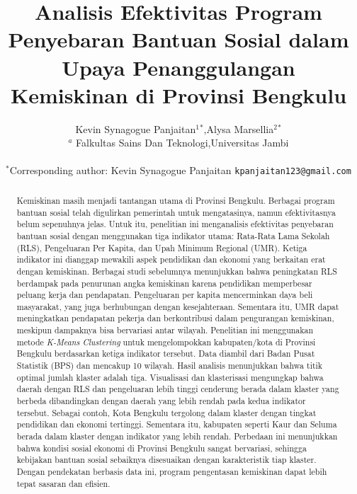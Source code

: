 \documentclass{article}
\title{Analisis Efektivitas Program Penyebaran Bantuan Sosial dalam Upaya Penanggulangan Kemiskinan di Provinsi Bengkulu}
\author{Kevin Synagogue Panjaitan$^{1}$$^{*}$,Alysa Marsellia$^{2}$$^{*}$  \\
        \small $^{a}$ Falkultas Sains Dan Teknologi,Universitas Jambi
        \\\\
        \small $^{*}$Corresponding author: Kevin Synagogue Panjaitan \tt{kpanjaitan123@gmail.com} \\
}
\date{}
\begin{document}
\maketitle


\begin{abstract} 
\noindent 

Kemiskinan masih menjadi tantangan utama di Provinsi Bengkulu. Berbagai program bantuan sosial telah digulirkan pemerintah untuk mengatasinya, namun efektivitasnya belum sepenuhnya jelas. Untuk itu, penelitian ini menganalisis efektivitas penyebaran bantuan sosial dengan menggunakan tiga indikator utama: Rata-Rata Lama Sekolah (RLS), Pengeluaran Per Kapita, dan Upah Minimum Regional (UMR). Ketiga indikator ini dianggap mewakili aspek pendidikan dan ekonomi yang berkaitan erat dengan kemiskinan. Berbagai studi sebelumnya menunjukkan bahwa peningkatan RLS berdampak pada penurunan angka kemiskinan karena pendidikan memperbesar peluang kerja dan pendapatan. Pengeluaran per kapita mencerminkan daya beli masyarakat, yang juga berhubungan dengan kesejahteraan. Sementara itu, UMR dapat meningkatkan pendapatan pekerja dan berkontribusi dalam pengurangan kemiskinan, meskipun dampaknya bisa bervariasi antar wilayah. Penelitian ini menggunakan metode \textit{K-Means Clustering} untuk mengelompokkan kabupaten/kota di Provinsi Bengkulu berdasarkan ketiga indikator tersebut. Data diambil dari Badan Pusat Statistik (BPS) dan mencakup 10 wilayah. Hasil analisis menunjukkan bahwa titik optimal jumlah klaster adalah tiga. Visualisasi dan klasterisasi mengungkap bahwa daerah dengan RLS dan pengeluaran lebih tinggi cenderung berada dalam klaster yang berbeda dibandingkan dengan daerah yang lebih rendah pada kedua indikator tersebut. Sebagai contoh, Kota Bengkulu tergolong dalam klaster dengan tingkat pendidikan dan ekonomi tertinggi. Sementara itu, kabupaten seperti Kaur dan Seluma berada dalam klaster dengan indikator yang lebih rendah. Perbedaan ini menunjukkan bahwa kondisi sosial ekonomi di Provinsi Bengkulu sangat bervariasi, sehingga kebijakan bantuan sosial sebaiknya disesuaikan dengan karakteristik tiap klaster. Dengan pendekatan berbasis data ini, program pengentasan kemiskinan dapat lebih tepat sasaran dan efisien.



 \end{abstract}


\noindent{}
\\
\end{document}

